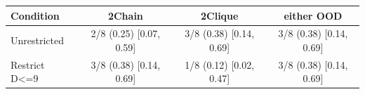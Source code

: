 \begin{tabular}{lccc}
\toprule
Condition & 2Chain & 2Clique & either OOD \\
\midrule
Unrestricted & 2/8 (0.25) [0.07, 0.59] & 3/8 (0.38) [0.14, 0.69] & 3/8 (0.38) [0.14, 0.69] \\
Restrict D<=9 & 3/8 (0.38) [0.14, 0.69] & 1/8 (0.12) [0.02, 0.47] & 3/8 (0.38) [0.14, 0.69] \\
\bottomrule
\end{tabular}

